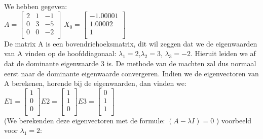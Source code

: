 
We hebben gegeven: \\
$ A =\begin{bmatrix} 
 2 & 1 & -1 \\
 0 & 3 & -5 \\
 0 & 0 & -2\\
\end{bmatrix}$
$ X_0 = \begin{bmatrix}
-1.00001 \\
1.00002 \\
1 \\
\end{bmatrix} $ \\
De matrix A is een bovendriehoeksmatrix, dit wil zeggen dat we de eigenwaarden van A vinden op de hoofddiagonaal: $\lambda_1 = 2$,$\lambda_2 = 3$, $\lambda_3 = -2$. Hieruit leiden we af dat de dominante eigenwaarde 3 is. De methode van de machten zal dus normaal eerst naar de dominante eigenwaarde convergeren. Indien we de eigenvectoren van A berekenen, horende bij de eigenwaarden, dan vinden we: \\

$ E1 = \begin{bmatrix}
1 \\
0 \\
0 \\
\end{bmatrix} E2 = \begin{bmatrix}
1 \\
1 \\
0 \\
\end{bmatrix}  E3 = \begin{bmatrix}
0\\
1 \\
1 \\
\end{bmatrix}$ \\

(We berekenden deze eigenvectoren met de formule: $(A-\lambda I)=0$ ) voorbeeld voor $\lambda_1 = 2$:

